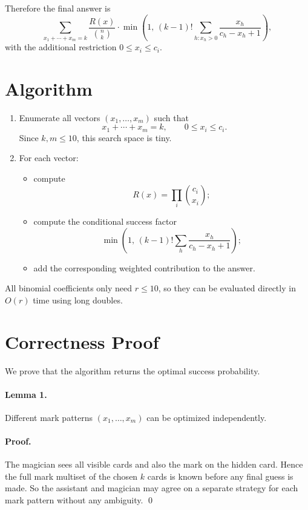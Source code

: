 \documentclass[11pt]{article}
\begin{document}
Therefore the final answer is
\[
    \sum_{x_1+\cdots+x_m=k}
    \frac{R(x)}{\binom{n}{k}}
    \cdot
    \min\!\left(1,\,
    (k-1)! \sum_{h : x_h > 0}
    \frac{x_h}{c_h - x_h + 1}\right),
\]
with the additional restriction $0 \le x_i \le c_i$.

\section*{Algorithm}

\begin{enumerate}[leftmargin=*]
    \item Enumerate all vectors $(x_1,\dots,x_m)$ such that
    \[
        x_1+\cdots+x_m=k, \qquad 0 \le x_i \le c_i.
    \]
    Since $k,m \le 10$, this search space is tiny.
    \item For each vector:
    \begin{itemize}[leftmargin=*]
        \item compute
        \[
            R(x) = \prod_i \binom{c_i}{x_i};
        \]
        \item compute the conditional success factor
        \[
            \min\!\left(1,\,
            (k-1)! \sum_h \frac{x_h}{c_h - x_h + 1}\right);
        \]
        \item add the corresponding weighted contribution to the answer.
    \end{itemize}
\end{enumerate}

All binomial coefficients only need $r \le 10$, so they can be evaluated directly in $O(r)$ time using
long doubles.

\section*{Correctness Proof}

We prove that the algorithm returns the optimal success probability.

\paragraph{Lemma 1.}
Different mark patterns $(x_1,\dots,x_m)$ can be optimized independently.

\paragraph{Proof.}
The magician sees all visible cards and also the mark on the hidden card. Hence the full mark multiset of
the chosen $k$ cards is known before any final guess is made. So the assistant and magician may agree on
a separate strategy for each mark pattern without any ambiguity. \qed
\end{document}
